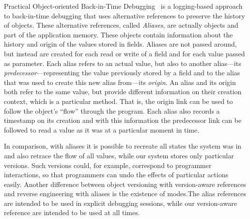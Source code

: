 Practical Object-oriented Back-in-Time Debugging~\cite{Lienhard2008POB,Lienhard2008PhD} is a logging-based approach to back-in-time debugging that uses alternative references to preserve the history of objects.
These alternative references, called \emph{Aliases}, are actually objects and part of the application memory.
These objects contain information about the history and origin of the values stored in fields.
Aliases are not passed around, but instead are created for each read or write of a field and for each value passed as parameter.
Each alias refers to an actual value, but also to another alias---its \emph{predecessor}---representing the value previously stored by a field and to the alias that was used to create this new alias from---its \emph{origin}.
An alias and its origin both refer to the same value, but provide different information on their creation context, which is a particular method.
That is, the origin link can be used to follow the object's ``flow'' through the program.
Each alias also records a timestamp on its creation and with this information the predecessor link can be followed to read a value as it was at a particular moment in time.

In comparison, with aliases it is possible to recreate all states the system was in and also retrace the flow of all values, while our system stores only particular versions.
Such versions could, for example, correspond to programmer interactions, so that programmers can undo the effects of particular actions easily.
Another difference between object versioning with version-aware references and reverse engineering with aliases is the existence of modes.The alias references are intended to be used in explicit debugging sessions, while our version-aware reference are intended to be used at all times.





